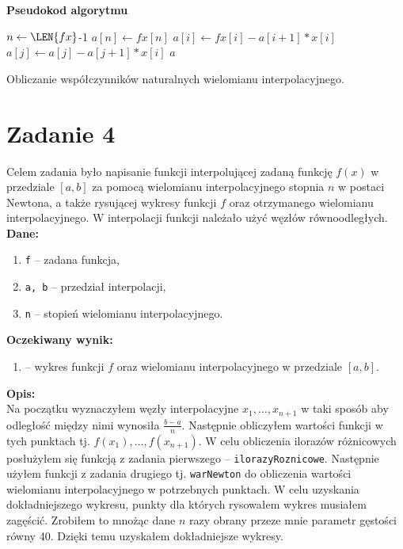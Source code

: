 \documentclass[]{article}
\begin{document}
	\noindent\textbf{Pseudokod algorytmu}\\
	\begin{algorithm}[h]
		\DontPrintSemicolon
		 {
			$n \gets \LEN{fx}$-1\;
			$a[n] \gets fx[n]$\;
			 {
				$a[i] \gets fx[i] - a[i+1] * x[i]$\; 
				 {
					$a[j] \gets a[j] - a[j+1] * x[i]$\; 	
				}	
			}
			\KwRet $a$\;
		}
		
		\caption{Obliczanie współczynników naturalnych wielomianu interpolacyjnego.}
	\end{algorithm}	
	
	
	\clearpage
	
	\section*{Zadanie 4}

	Celem zadania było napisanie funkcji interpolującej zadaną funkcję $f(x)$ w przedziale $[a, b]$ za pomocą wielomianu interpolacyjnego stopnia $n$ w postaci Newtona, a także rysującej wykresy funkcji $f$ oraz otrzymanego wielomianu interpolacyjnego. W interpolacji funkcji należało użyć węzłów równoodległych.\\
	\textbf{Dane:}
	\begin{enumerate}[]
		\item \texttt{f} -- zadana funkcja,
		\item \texttt{a, b} --  przedział interpolacji,
		\item \texttt{n} --  stopień wielomianu interpolacyjnego.
	\end{enumerate}
	\textbf{Oczekiwany wynik:}
	\begin{enumerate}[]
		\item -- wykres funkcji $f$ oraz wielomianu interpolacyjnego w przedziale $[a,b]$.
	\end{enumerate}
	\textbf{Opis:}\\
	Na początku wyznaczyłem węzły interpolacyjne $x_1, \ldots, x_{n+1}$ w taki sposób aby odległość między nimi wynosiła $\frac{b-a}{n}$. Następnie obliczyłem wartości funkcji w tych punktach tj. $f(x_1), \ldots, f(x_{n+1})$.
	W celu obliczenia ilorazów różnicowych posłużyłem się funkcją z zadania pierwszego -- \texttt{ilorazyRoznicowe}. Następnie użyłem funkcji z zadania drugiego tj. \texttt{warNewton} do obliczenia wartości wielomianu interpolacyjnego w potrzebnych punktach. W celu uzyskania dokładniejszego wykresu, punkty dla których rysowałem wykres musiałem zagęścić. Zrobiłem to mnożąc dane $n$ razy obrany przeze mnie parametr gęstości równy 40. Dzięki temu uzyskałem dokładniejsze wykresy.
	
\end{document}
